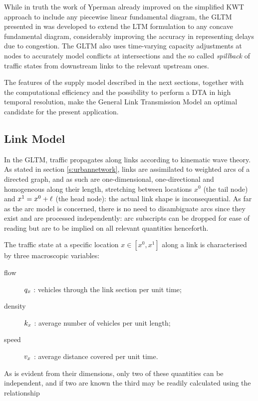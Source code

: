 While in truth the work of Yperman already improved on the simplified KWT approach to include any piecewise linear fundamental diagram, the GLTM presented in \cite{gentile2010general} was developed to extend the LTM formulation to any concave fundamental diagram, considerably improving the accuracy in representing delays due to congestion. The GLTM also uses time-varying capacity adjustments at nodes to accurately model conflicts at intersections and the so called \emph{spillback} of traffic states from downstream links to the relevant upstream ones.

The features of the supply model described in the next sections, together with the computational efficiency and the possibility to perform a DTA in high temporal resolution, make the General Link Transmission Model an optimal candidate for the present application.


\subsection{Link Model} \label{s:linkmodel}
In the GLTM, traffic propagates along links according to kinematic wave theory.
As stated in section \ref{s:urbannetwork}, links are assimilated to weighted arcs of a directed graph, and as such are one-dimensional, one-directional and homogeneous along their length, stretching between locations $x^0$ (the tail node) and $x^1 = x^0 + \ell$ (the head node): the actual link shape is inconsequential. As far as the arc model is concerned, there is no need to disambiguate arcs since they exist and are processed independently: arc subscripts can be dropped for ease of reading but are to be implied on all relevant quantities henceforth.

The traffic state at a specific location $x \in \left[x^0, x^1\right]$ along a link is characterised by three macroscopic variables:
\begin{description}
\item[flow] $q_x$ : vehicles through the link section per unit time;
\item[density] $k_x$ : average number of vehicles per unit length;
\item[speed] $v_x$ : average distance covered per unit time.
\end{description}
As is evident from their dimensions, only two of these quantities can be independent, and if two are known the third may be readily calculated using the relationship


